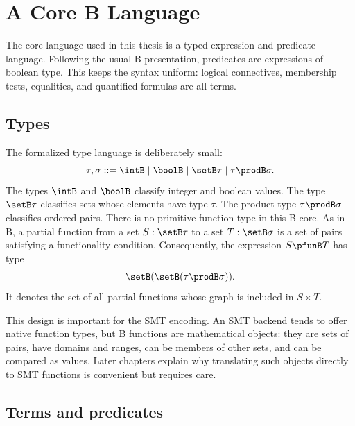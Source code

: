 \section{A Core B Language}
\label{sec:b-core-language}

The core language used in this thesis is a typed expression and predicate language.
Following the usual B presentation, predicates are expressions of boolean type.
This keeps the syntax uniform: logical connectives, membership tests, equalities, and quantified formulas are all terms.

\subsection{Types}

The formalized type language is deliberately small:
\[
  \tau, \sigma ::= \intB
  \mid \boolB
  \mid \setB \tau
  \mid \tau \prodB \sigma.
\]
The types \(\intB\) and \(\boolB\) classify integer and boolean values.
The type \(\setB \tau\) classifies sets whose elements have type \(\tau\).
The product type \(\tau \prodB \sigma\) classifies ordered pairs.
There is no primitive function type in this B core.
As in B, a partial function from a set \(S : \setB \tau\) to a set \(T : \setB \sigma\) is a set of pairs satisfying a functionality condition.
Consequently, the expression \(S \pfunB T\) has type
\[
  \setB(\setB(\tau \prodB \sigma)).
\]
It denotes the set of all partial functions whose graph is included in \(S \times T\).

This design is important for the SMT encoding.
An SMT backend tends to offer native function types, but B functions are mathematical objects: they are sets of pairs, have domains and ranges, can be members of other sets, and can be compared as values.
Later chapters explain why translating such objects directly to SMT functions is convenient but requires care.

\subsection{Terms and predicates}

